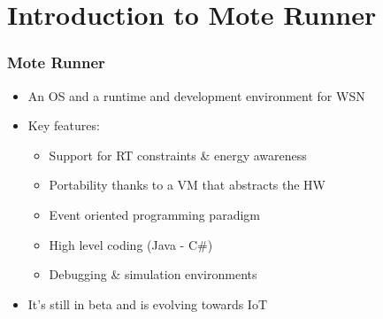 \section{Introduction to Mote Runner}
\begin{frame}[fragile]
  \frametitle{Mote Runner}
  \begin{itemize}
    \item An OS and a runtime and development environment for WSN
    \item Key features:
    \begin{itemize}
      \item Support for RT constraints \& energy awareness
      \item Portability thanks to a VM that abstracts the HW
      \item Event oriented programming paradigm
      \item High level coding (Java - C\#)
      \item Debugging \& simulation environments
    \end{itemize}
    \item It’s still in beta and is evolving towards IoT
  \end{itemize}
\end{frame}

